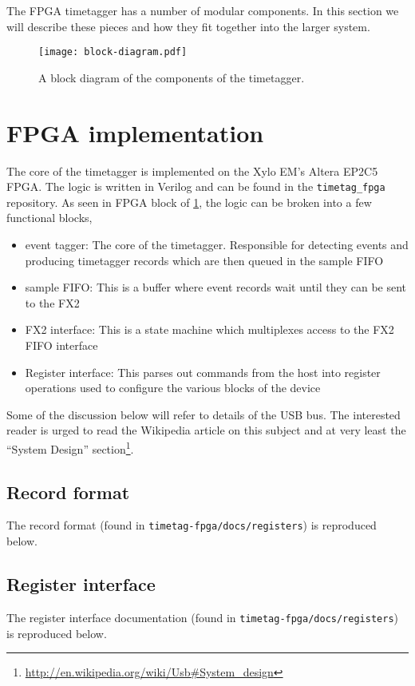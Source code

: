 The FPGA timetagger has a number of modular components. In this
section we will describe these pieces and how they fit together into
the larger system.

\begin{figure}
  \center
  \texttt{[image: block-diagram.pdf]}
  \caption{A block diagram of the components of the timetagger.}
  \label{Fig:BlockDiagram}
\end{figure}

\section{FPGA implementation}
The core of the timetagger is implemented on the Xylo EM's Altera
EP2C5 FPGA. The logic is written in Verilog and can be found in the
{\tt timetag\_fpga} repository. As seen in FPGA block of
\ref{Fig:BlockDiagram}, the logic can be broken into a few functional
blocks,

\begin{itemize}
  \item event tagger: The core of the timetagger. Responsible for
    detecting events and producing timetagger records which are then
    queued in the sample FIFO
  \item sample FIFO: This is a buffer where event records wait until
    they can be sent to the FX2
  \item FX2 interface: This is a state machine which multiplexes
    access to the FX2 FIFO interface
  \item Register interface: This parses out commands from the host
    into register operations used to configure the various blocks of
    the device
\end{itemize}

Some of the discussion below will refer to details of the USB bus. The
interested reader is urged to read the Wikipedia article on this
subject and at very least the ``System Design''
section\footnote{\url{http://en.wikipedia.org/wiki/Usb#System_design}}.

\subsection{Record format}
The record format (found in {\tt timetag-fpga/docs/registers}) is reproduced below.



\subsection{Register interface}
The register interface documentation (found in
{\tt timetag-fpga/docs/registers}) is reproduced below.

